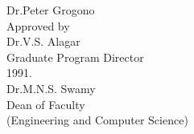\begin{titlepage}
    \hspace*{77pt}Dr.\@ Peter Grogono\\[2.5ex]
    Approved by \hspace{9pt}\underline{\hspace{232pt}}\\
    \hspace*{79pt}Dr.\@ V.S. Alagar\\
    \hspace*{79pt}Graduate Program Director\\[6ex]
    \underline{\hspace*{110pt}} 1991. \hspace{64pt} \underline{\hspace{219pt}}\\
    \hspace*{213pt}Dr.\@ M.N.S. Swamy\\
    \hspace*{213pt}Dean of Faculty\\    
    \hspace*{213pt}(Engineering and Computer Science)
  \end{titlepage}
